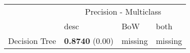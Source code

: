 \begin{tabular}{|l|l|l|l| }
\hline
 &  \multicolumn{3}{c|}{ Precision - Multiclass} \\
\cline{2-4} & desc & BoW & both \\ \hline
Decision Tree & {\bf 0.8740} (0.00) & missing  & missing \\
\hline
\end{tabular}